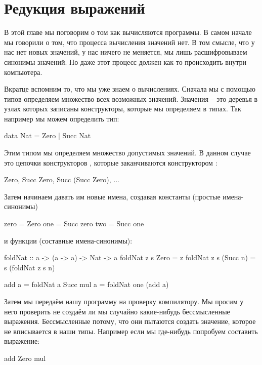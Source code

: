 \setcounter{chapter}{7}
\chapter{Редукция выражений}

В этой главе мы поговорим о том как вычисляются программы. 
В самом начале мы говорили о том, что 
процесса вычисления значений нет. В том смысле, что у нас
нет новых значений, у нас ничего не меняется, мы лишь
расшифровываем синонимы значений. Но даже этот процесс
должен как-то происходить внутри компьютера. 

Вкратце вспомним то, что мы уже знаем о вычислениях.
Сначала мы с помощью типов определяем
множество всех возможных значений. Значения -- это деревья
в узлах которых записаны конструкторы, которые мы 
определяем в типах. Так например мы можем определить тип:

\begin{code}
data Nat = Zero | Succ Nat
\end{code}

Этим типом мы определяем множество допустимых значений. 
В данном случае это цепочки конструкторов ,
которые заканчиваются конструктором :

\begin{code}
Zero, Succ Zero, Succ (Succ Zero), ...
\end{code}
    
Затем начинаем давать им
новые имена, создавая константы (простые имена-синонимы) 
  
\begin{code}
zero    = Zero
one     = Succ zero
two     = Succ one
\end{code}


\noindent и функции (составные имена-синонимы):

\begin{code}
foldNat :: a -> (a -> a) -> Nat -> a
foldNat z  s  Zero      = z
foldNat z  s  (Succ n)  = s (foldNat z s n)

add a = foldNat a   Succ
mul a = foldNat one (add a) 
\end{code}

Затем мы передаём нашу программу на проверку компилятору. 
Мы просим у него проверить не создаём ли мы случайно 
какие-нибудь бессмысленные
выражения. Бессмысленные потому, что они пытаются 
создать значение, которое не вписывается в наши типы.
Например если мы где-нибудь попробуем составить выражение:

\begin{code}
add Zero mul
\end{code}

